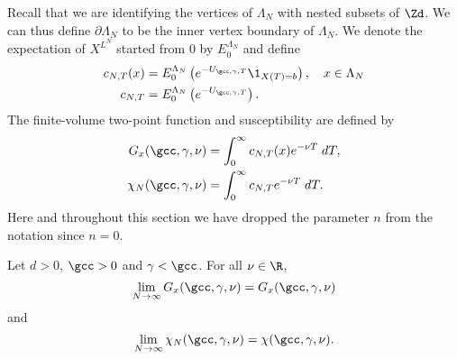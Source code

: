 Recall that we are identifying the vertices of $\Lambda_N$ with nested subsets of $\Zd$.
We can thus define $\partial \Lambda_N$ to be the inner vertex boundary of $\Lambda_N$.
We denote the expectation of $X^{L^N}$ started from $0$ by $E^{\Lambda_N}_0$
and define
\begin{align}
\label{e:cN}
c_{N,T}(x)
    &=
E^{\Lambda_N}_0 \left( e^{-U_{\gcc,\gamma,T}} \1_{X(T)=b} \right),
	\quad
x \in \Lambda_N \\
c_{N,T}
    &=
E^{\Lambda_N}_0 \left( e^{-U_{\gcc,\gamma,T}} \right).
\end{align}
The finite-volume two-point function and susceptibility
are defined by
\begin{align}
G_x(\gcc,\gamma,\nu)
    &= \int_0^\infty c_{N,T}(x) e^{-\nu T} \; dT, \\
\chi_N(\gcc, \gamma, \nu)
    &= \int_0^\infty c_{N,T} e^{-\nu T} \; dT
    .
    \label{e:chiNdef}
\end{align}
Here and throughout this section we have dropped the parameter $n$
from the notation since $n = 0$.

\begin{prop}
\label{prop:finvol-re}
Let $d >0$, $\gcc >0$ and $\gamma < \gcc$. For all $\nu \in \R$,
\begin{equation}
\label{e:Givlc}
\lim_{N \to \infty}
G_x(\gcc,\gamma,\nu)
=
G_x(\gcc,\gamma,\nu)
\end{equation}
and
\begin{equation}
\label{e:chilim}
\lim_{N\to\infty}\chi_N(\gcc,\gamma,\nu)=   \chi(\gcc,\gamma,\nu).
\end{equation}
\end{prop}

